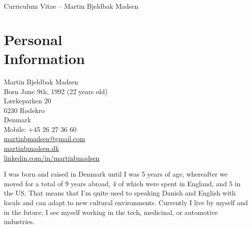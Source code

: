 \documentclass[margin,line,a4paper]{resume}
\begin{document}
\raggedright
{\sc \Large Curriculum Vitae -- Martin Bjeldbak Madsen}
\begin{resume}
    \vspace{0.5cm}
    \begin{figure}
         \vspace{-1cm}
        \begin{center}
        \end{center}
         \vspace{-2cm}
    \end{figure}

    \section{\mysidestyle Personal\\Information}%
    Martin Bjeldbak Madsen\\
    Born June 9th, 1992 (22 years old)\\ 
    Lærkeparken 20\\
    6230 Rødekro\\
    Denmark\\
    Mobile: +45 26 27 36 60\\
    \href{mailto:martinbmadsen@gmail.com}{martinbmadsen@gmail.com}\\
    \href{http://martinbmadsen.dk}{martinbmadsen.dk}\\
    \href{http://dk.linkedin.com/in/martinbmadsen/}{linkedin.com/in/martinbmadsen}
    \vspace{0.5cm}

    I was born and raised in Denmark until I was 5 years of age,
    whereafter we moved for a total of 9 years abroad, 4 of which
    were spent in England, and 5 in the US. That means that I'm quite
    used to speaking Danish and English with locals and can adapt to
    new cultural environments. Currently I live by myself and in the
    future, I see myself working in the tech, medicinal, or automotive
    industries.


\end{resume}
\end{document}
